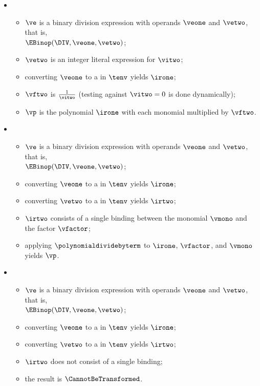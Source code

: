 \begin{itemize}
  \item {}
  \begin{itemize}
    \item $\ve$ is a binary division expression with operands $\veone$ and $\vetwo$, that is, \\ $\EBinop(\DIV, \veone, \vetwo)$;
    \item $\vetwo$ is an integer literal expression for $\vitwo$;
    \item converting $\veone$ to a \symbolicexpressionterm{} in $\tenv$ yields $\irone$\ProseOrTypeErrorOrCannotBeTransformed;
    \item $\vftwo$ is $\frac{1}{\vitwo}$ (testing against $\vitwo = 0$ is done dynamically);
    \item $\vp$ is the polynomial $\irone$ with each monomial multiplied by $\vftwo$.
  \end{itemize}

  \item {}
  \begin{itemize}
    \item $\ve$ is a binary division expression with operands $\veone$ and $\vetwo$, that is, \\ $\EBinop(\DIV, \veone, \vetwo)$;
    \item converting $\veone$ to a \symbolicexpressionterm{} in $\tenv$ yields $\irone$\ProseOrTypeErrorOrCannotBeTransformed;
    \item converting $\vetwo$ to a \symbolicexpressionterm{} in $\tenv$ yields $\irtwo$\ProseOrTypeErrorOrCannotBeTransformed;
    \item $\irtwo$ consists of a single binding between the monomial $\vmono$ and the factor $\vfactor$;
    \item applying $\polynomialdividebyterm$ to $\irone$, $\vfactor$, and $\vmono$ yields $\vp$\ProseTerminateAs{\CannotBeTransformed}.
  \end{itemize}

  \item {}
  \begin{itemize}
    \item $\ve$ is a binary division expression with operands $\veone$ and $\vetwo$, that is, \\ $\EBinop(\DIV, \veone, \vetwo)$;
    \item converting $\veone$ to a \symbolicexpressionterm{} in $\tenv$ yields $\irone$\ProseOrTypeErrorOrCannotBeTransformed;
    \item converting $\vetwo$ to a \symbolicexpressionterm{} in $\tenv$ yields $\irtwo$\ProseOrTypeErrorOrCannotBeTransformed;
    \item $\irtwo$ does not consist of a single binding;
    \item the result is $\CannotBeTransformed$.
  \end{itemize}


\end{itemize}

